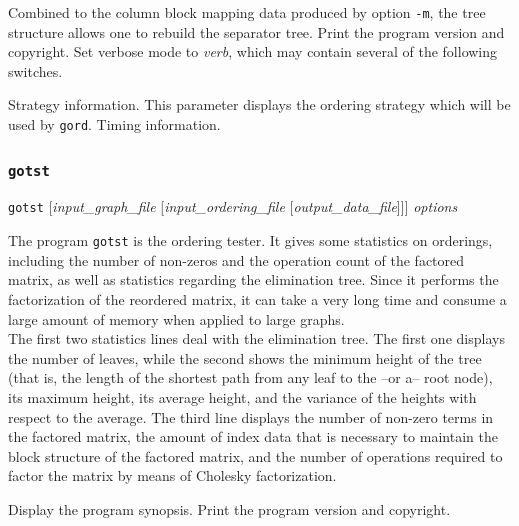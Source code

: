 \begin{itemize}
\begin{itemize}
Combined to the column block mapping data produced by option \texttt{-m},
the tree structure allows one to rebuild the separator tree.
\iteme[\texttt{-V}]
Print the program version and copyright.
Set verbose mode to {\it verb}, which may contain several of the following
switches.
\begin{itemize}
\iteme[\texttt{s}]
Strategy information. This parameter displays the ordering
strategy which will be used by \texttt{gord}.
\iteme[\texttt{t}]
Timing information.
\end{itemize}
\end{itemize}
\end{itemize}

\subsubsection{\texttt{gotst}}
\label{sec-prog-gotst}

\begin{itemize}
\progsyn
\texttt{gotst} [{\it input\_graph\_file} [{\it input\_ordering\_file} [{\it output\_data\_file}]]] {\it options}

\progdes
The program \texttt{gotst} is the ordering tester. It gives some
statistics on orderings, including the number of non-zeros and
the operation count of the factored matrix, as well as statistics
regarding the elimination tree. Since it performs the factorization
of the reordered matrix, it can take a very long time and consume
a large amount of memory when applied to large graphs.
\\
The first two statistics lines deal with the elimination tree. The
first one displays the number of leaves, while the second shows
the minimum height of the tree (that is, the
length of the shortest path from any leaf to the --or a-- root node),
its maximum height, its average height, and the variance of the
heights with respect to the average.
The third line displays the number of non-zero terms in the factored
matrix, the amount of index data that is necessary to maintain the
block structure of the factored matrix, and the number of operations
required to factor the matrix by means of Cholesky factorization.

\progopt
\begin{itemize}
\iteme[\texttt{-h}]
Display the program synopsis.
\iteme[\texttt{-V}]
Print the program version and copyright.
\end{itemize}
\end{itemize}

